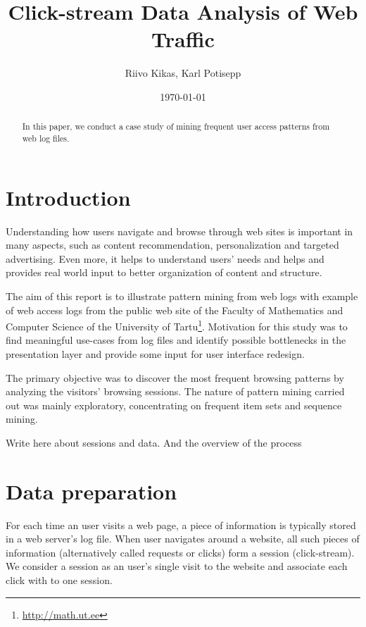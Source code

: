\documentclass[english,a4paper]{article}
\begin{document}
\title{Click-stream Data Analysis of Web Traffic}
\author{Riivo Kikas, Karl Potisepp}
\date{\today}
\maketitle

\begin{abstract}
In this paper, we conduct a case study of mining frequent user access patterns from web log files.
\end{abstract}





\section{Introduction} 
Understanding how users navigate and browse through web sites is important in many aspects, such as content recommendation,
personalization and targeted advertising. Even more, it helps to understand users' needs and helps and provides real world input to better organization of content and structure.

The aim of this report is to illustrate pattern mining from web logs with example of web access logs from the public web site of the Faculty of Mathematics and Computer Science of the University of Tartu\footnote{\url{http://math.ut.ee}}. Motivation for this study was to find meaningful use-cases from log files and identify possible bottlenecks in the presentation layer and provide some input for user interface redesign.

The primary objective was to discover the most frequent browsing patterns by analyzing the visitors' browsing sessions. The nature of pattern mining carried out was mainly exploratory, concentrating on frequent item sets and sequence mining.

Write here about sessions and data. And the overview of the process








\section{Data preparation} 
For each time an user visits a web page, a piece of information is typically stored in a web server's log file. When user navigates around a website, all such pieces of information (alternatively called requests or clicks) form a session (click-stream). We consider a session as an user's single visit to the website and associate each click with to one session.
\end{document}
